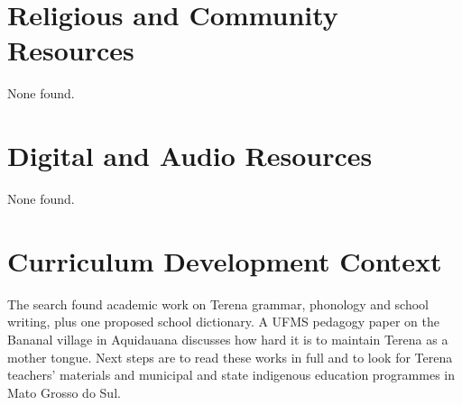 \documentclass[12pt]{article}
\begin{document}
\section{Religious and Community Resources}
None found.

\section{Digital and Audio Resources}
None found.

\section{Curriculum Development Context}
The search found academic work on Terena grammar, phonology and school writing, plus one proposed school dictionary. A UFMS pedagogy paper on the Bananal village in Aquidauana discusses how hard it is to maintain Terena as a mother tongue. Next steps are to read these works in full and to look for Terena teachers' materials and municipal and state indigenous education programmes in Mato Grosso do Sul.
\end{document}
